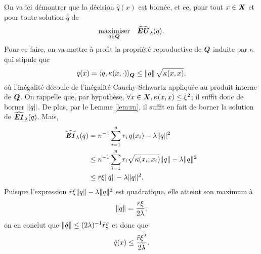 \begin{lemme}
  \label{lem:bqhat}
  On va ici démontrer que la décision $\hat q(x)$ est bornée, et ce, pour tout $x \in \bm{X}$ et
  pour toute solution $\hat q$ de
  \begin{equation}
    \label{b:l1}
    \maximizeEquation[q \in \Q]{\hEU_\lambda(q).}
  \end{equation}
  Pour ce faire, on va mettre à profit la propriété reproductive de $\bm Q$ induite par
  $\kappa$ qui stipule que
  \begin{equation}
    q(x) = \langle q, \kappa(x,\cdot)\rangle_{\bm Q} \leq\|q\|\,\sqrt{\kappa(x,x)},
  \end{equation}
  où l'inégalité découle de l'inégalité Cauchy-Schwartz appliquée au produit interne de
  $\bm Q$.  On rappelle que, par hypothèse, $\forall x\in\bm{X}, \kappa(x,x) \leq \xi^2$; il suffit donc de borner
  $\|q\|$. De plus, par le Lemme \ref{lem:rn}, il suffit en fait de borner la solution de
  $\operatorname{\widehat{\operatorname{\mbox{\textbf{\textit{E1}}}}}}_\lambda(q)$. Mais,
  \begin{align}
    \operatorname{\widehat{\operatorname{\mbox{\textbf{\textit{E1}}}}}}_\lambda(q) &= n^{-1}\sum_{i=1}^n r_i\,q(x_i) - \lambda\|q\|^2\\
              & \leq n^{-1}\sum_{i=1}^n r_i\sqrt{\kappa(x_i,x_i)}\|q\| - \lambda\|q\|^2\\
              & \leq \bar r \xi \|q\| - \lambda\|q\|^2.
  \end{align}
  Puisque l'expression $\bar r \xi \|q\| - \lambda\|q\|^2$ est quadratique, elle atteint son
  maximum à
  \begin{equation}
    \|q\| = \frac{\bar r \xi}{2\lambda},
  \end{equation}
  on en conclut que $\|\hat q\| \leq (2\lambda)^{-1}\bar r\xi$ et donc que
  \begin{equation}
    \hat q(x) \leq \frac{\bar r\xi^2}{2\lambda}.
  \end{equation}
\end{lemme}



